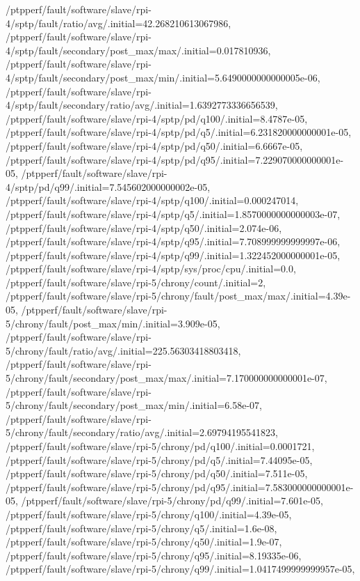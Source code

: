 {    /ptpperf/fault/software/slave/rpi-4/sptp/fault/ratio/avg/.initial=42.268210613067986,
    /ptpperf/fault/software/slave/rpi-4/sptp/fault/secondary/post_max/max/.initial=0.017810936,
    /ptpperf/fault/software/slave/rpi-4/sptp/fault/secondary/post_max/min/.initial=5.6490000000000005e-06,
    /ptpperf/fault/software/slave/rpi-4/sptp/fault/secondary/ratio/avg/.initial=1.6392773336656539,
    /ptpperf/fault/software/slave/rpi-4/sptp/pd/q100/.initial=8.4787e-05,
    /ptpperf/fault/software/slave/rpi-4/sptp/pd/q5/.initial=6.231820000000001e-05,
    /ptpperf/fault/software/slave/rpi-4/sptp/pd/q50/.initial=6.6667e-05,
    /ptpperf/fault/software/slave/rpi-4/sptp/pd/q95/.initial=7.229070000000001e-05,
    /ptpperf/fault/software/slave/rpi-4/sptp/pd/q99/.initial=7.545602000000002e-05,
    /ptpperf/fault/software/slave/rpi-4/sptp/q100/.initial=0.000247014,
    /ptpperf/fault/software/slave/rpi-4/sptp/q5/.initial=1.8570000000000003e-07,
    /ptpperf/fault/software/slave/rpi-4/sptp/q50/.initial=2.074e-06,
    /ptpperf/fault/software/slave/rpi-4/sptp/q95/.initial=7.708999999999997e-06,
    /ptpperf/fault/software/slave/rpi-4/sptp/q99/.initial=1.322452000000001e-05,
    /ptpperf/fault/software/slave/rpi-4/sptp/sys/proc/cpu/.initial=0.0,
    /ptpperf/fault/software/slave/rpi-5/chrony/count/.initial=2,
    /ptpperf/fault/software/slave/rpi-5/chrony/fault/post_max/max/.initial=4.39e-05,
    /ptpperf/fault/software/slave/rpi-5/chrony/fault/post_max/min/.initial=3.909e-05,
    /ptpperf/fault/software/slave/rpi-5/chrony/fault/ratio/avg/.initial=225.56303418803418,
    /ptpperf/fault/software/slave/rpi-5/chrony/fault/secondary/post_max/max/.initial=7.170000000000001e-07,
    /ptpperf/fault/software/slave/rpi-5/chrony/fault/secondary/post_max/min/.initial=6.58e-07,
    /ptpperf/fault/software/slave/rpi-5/chrony/fault/secondary/ratio/avg/.initial=2.69794195541823,
    /ptpperf/fault/software/slave/rpi-5/chrony/pd/q100/.initial=0.0001721,
    /ptpperf/fault/software/slave/rpi-5/chrony/pd/q5/.initial=7.44095e-05,
    /ptpperf/fault/software/slave/rpi-5/chrony/pd/q50/.initial=7.511e-05,
    /ptpperf/fault/software/slave/rpi-5/chrony/pd/q95/.initial=7.583000000000001e-05,
    /ptpperf/fault/software/slave/rpi-5/chrony/pd/q99/.initial=7.601e-05,
    /ptpperf/fault/software/slave/rpi-5/chrony/q100/.initial=4.39e-05,
    /ptpperf/fault/software/slave/rpi-5/chrony/q5/.initial=1.6e-08,
    /ptpperf/fault/software/slave/rpi-5/chrony/q50/.initial=1.9e-07,
    /ptpperf/fault/software/slave/rpi-5/chrony/q95/.initial=8.19335e-06,
    /ptpperf/fault/software/slave/rpi-5/chrony/q99/.initial=1.0417499999999957e-05,
}
